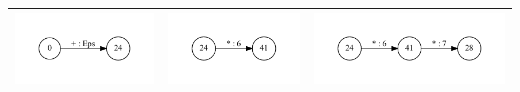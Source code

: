 \documentclass{matmex-diploma}
\begin{document}
\begin{table}[h]
  \centering
  \begin{tabular}{ | c | c | c |}
    \hline
    \begin{minipage}{.3\textwidth}
      \includegraphics[width=\linewidth]{0_int}
    \end{minipage}
    &
    \begin{minipage}{.3\textwidth}
      \includegraphics[width=\linewidth]{24_int}
    \end{minipage}
    & 
    \begin{minipage}{.3\textwidth}
      \includegraphics[width=\linewidth]{24_1_int}
    \end{minipage}
    \\ \hline

\end{tabular}
\end{table}
\end{document}

